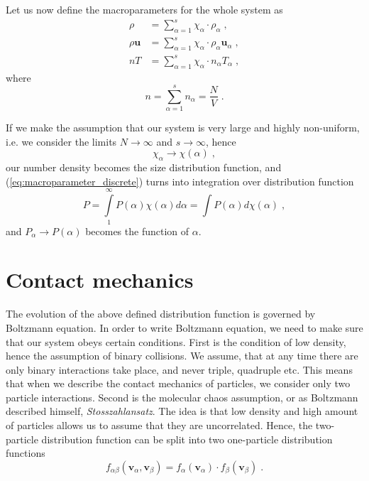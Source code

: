 \documentclass[preprint, aps, pra]{revtex4-1}
\newcommand{\ab}{{\alpha\beta}}
\newcommand{\bv}{{\bm{v}}}
\newcommand{\bu}{{\bm{u}}}
\begin{document}
Let us now define the macroparameters for the whole system as
\begin{equation}
  \begin{split}
    \rho &= \sum_{\alpha=1}^{s}\chi_\alpha\cdot\rho_\alpha\;,\\
    \rho\bu &= \sum_{\alpha=1}^{s}\chi_\alpha\cdot\rho_\alpha\bu_\alpha\;,\\
    nT &= \sum_{\alpha=1}^{s}\chi_\alpha\cdot n_\alpha T_\alpha\;,
  \end{split}
\end{equation}
where
\begin{equation}
  n = \sum_{\alpha=1}^{s} n_\alpha = \frac{N}{V}\;.
\end{equation}

If we make the assumption that our system is very large and 
highly non-uniform, i.e. we consider the limits $N\to\infty$ and $s\to\infty$, hence 
\begin{equation}
  \chi_\alpha\rightarrow\chi(\alpha)\;,
\end{equation}
our number density becomes the size distribution function, and (\ref{eq:macroparameter_discrete}) turns into integration over
distribution function
\begin{equation}
  P = \int\limits_1^\infty P(\alpha)\chi(\alpha)d\alpha=\int P(\alpha)d\chi(\alpha)\;,
\end{equation}
and $P_\alpha\rightarrow P(\alpha)$ becomes the function of $\alpha$.

\section{Contact mechanics}

The evolution of the above defined distribution function is governed by Boltzmann equation. In order to write
Boltzmann equation, we need to make sure that our system obeys certain conditions. First is the condition of low density, hence 
the assumption of binary collisions. We assume, that at any time there are only binary interactions take place, 
and never triple, quadruple etc. This means that when we describe the contact mechanics of particles, we consider only two particle
interactions. Second is the molecular chaos assumption, or as Boltzmann described himself, \emph{Stosszahlansatz}. The idea is 
that low density and high amount of particles allows us to assume that they are uncorrelated. Hence, the two-particle distribution
function can be split into two one-particle distribution functions
\begin{equation}
  f_\ab(\bv_\alpha, \bv_\beta)=f_\alpha(\bv_\alpha)\cdot f_\beta(\bv_\beta)\;.
\end{equation}
\end{document}
